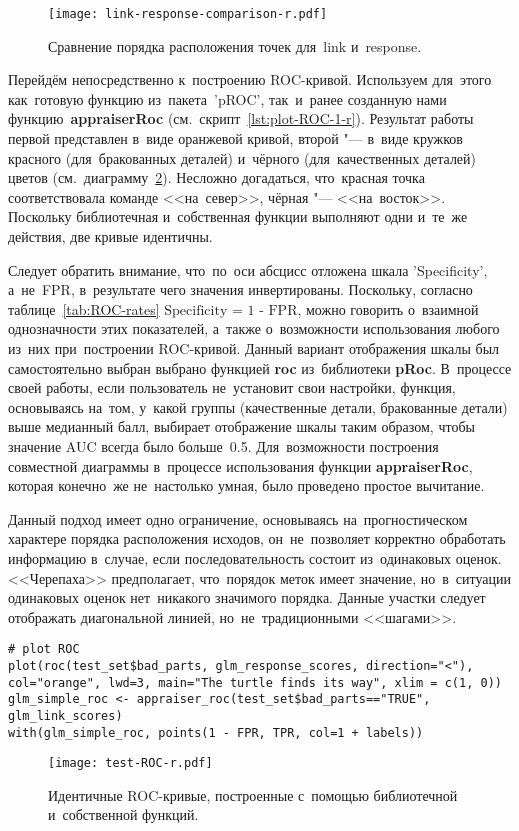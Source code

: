 \documentclass[]{scrreprt}
\begin{document}
%
%
\begin{figure}[ht]
	\centering
	\texttt{[image: link-response-comparison-r.pdf]}
	\caption{Сравнение порядка расположения точек для~\foreignlanguage{english}{link} и~\foreignlanguage{english}{response}.}
	\label{fig:link-response-comparison-r}
\end{figure}
%

Перейдём непосредственно к~построению ROC-кривой. Используем для~этого как~готовую функцию из~пакета~'pROC', так~и~ранее созданную нами функцию~\textbf{appraiserRoc} (см.~скрипт~\ref{lst:plot-ROC-1-r}). Результат работы первой представлен в~виде оранжевой кривой, второй "--- в~виде кружков красного (для~бракованных деталей) и~чёрного (для~качественных деталей) цветов (см.~диаграмму~\ref{fig:test-ROC-r}). Несложно догадаться, что~красная точка соответствовала команде <<на~север>>, чёрная "--- <<на~восток>>. Поскольку библиотечная и~собственная функции выполняют одни и~те~же действия, две кривые идентичны.

Следует обратить внимание, что~по~оси абсцисс отложена шкала \foreignlanguage{english}{'Specificity'}, а~не~FPR, в~результате чего значения инвертированы. Поскольку, согласно таблице~\ref{tab:ROC-rates} $\text{Specificity = 1 - FPR}$, можно говорить о~взаимной однозначности этих показателей, а~также о~возможности использования любого из~них при~построении ROC-кривой. Данный вариант отображения шкалы был самостоятельно выбран выбрано функцией \textbf{roc} из~библиотеки \textbf{pRoc}. В~процессе своей работы, если пользователь не~установит свои настройки, функция, основываясь на~том, у~какой группы (качественные детали, бракованные детали) выше медианный балл, выбирает отображение шкалы таким образом, чтобы значение AUC всегда было больше~0.5. Для~возможности построения совместной диаграммы в~процессе использования функции \textbf{appraiserRoc}, которая конечно~же не~настолько умная, было проведено простое вычитание.

Данный подход имеет одно ограничение, основываясь на~прогностическом характере порядка расположения исходов, он~не~позволяет корректно обработать информацию в~случае, если последовательность состоит из~одинаковых оценок. <<Черепаха>> предполагает, что~порядок меток имеет значение, но~в~ситуации одинаковых оценок нет~никакого значимого порядка. Данные участки следует отображать диагональной линией, но~не~традиционными <<шагами>>.
%
\begin{lstlisting}[float, caption = Построение ROC-кривой с~помощью библиотечной и~собственной функций, firstnumber=1, label= lst:plot-ROC-1-r]
# plot ROC
plot(roc(test_set$bad_parts, glm_response_scores, direction="<"),
col="orange", lwd=3, main="The turtle finds its way", xlim = c(1, 0))
glm_simple_roc <- appraiser_roc(test_set$bad_parts=="TRUE", glm_link_scores)
with(glm_simple_roc, points(1 - FPR, TPR, col=1 + labels))
\end{lstlisting}
%
\begin{figure}[ht]
	\centering
	\texttt{[image: test-ROC-r.pdf]}
	\caption{Идентичные ROC-кривые, построенные с~помощью библиотечной и~собственной функций.}
	\label{fig:test-ROC-r}
\end{figure}
%
\end{document}
